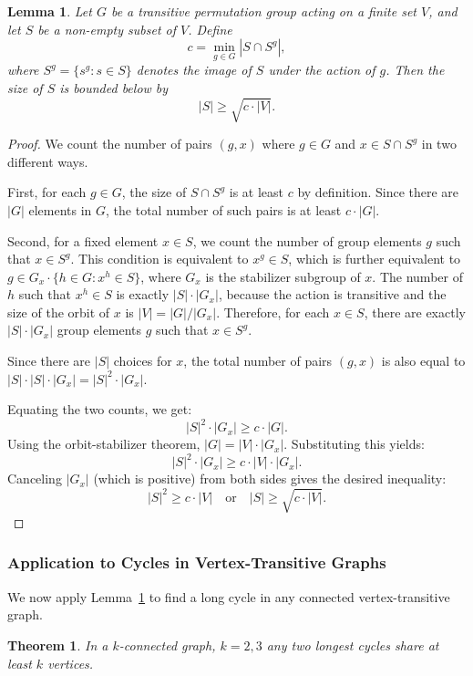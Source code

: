 \documentclass[12pt,a4paper,openany]{book}
\newtheorem{theorem}{Theorem}[section]
\newtheorem{lemma}{Lemma}[section]
\begin{document}
\begin{lemma}\label{lem:permutation-intersection}
Let $G$ be a transitive permutation group acting on a finite set $V$, and let $S$ be a non-empty subset of $V$. Define
\[
c = \min_{g \in G} |S \cap S^g|,
\]
where $S^g = \{s^g : s \in S\}$ denotes the image of $S$ under the action of $g$. Then the size of $S$ is bounded below by
\[
|S| \ge \sqrt{c \cdot |V|}.
\]
\end{lemma}
\begin{proof}
We count the number of pairs $(g, x)$ where $g \in G$ and $x \in S \cap S^g$ in two different ways.

First, for each $g \in G$, the size of $S \cap S^g$ is at least $c$ by definition. Since there are $|G|$ elements in $G$, the total number of such pairs is at least $c \cdot |G|$.

Second, for a fixed element $x \in S$, we count the number of group elements $g$ such that $x \in S^g$. This condition is equivalent to $x^g \in S$, which is further equivalent to $g \in G_x \cdot \{h \in G : x^h \in S\}$, where $G_x$ is the stabilizer subgroup of $x$. The number of $h$ such that $x^h \in S$ is exactly $|S| \cdot |G_x|$, because the action is transitive and the size of the orbit of $x$ is $|V| = |G| / |G_x|$. Therefore, for each $x \in S$, there are exactly $|S| \cdot |G_x|$ group elements $g$ such that $x \in S^g$.

Since there are $|S|$ choices for $x$, the total number of pairs $(g, x)$ is also equal to $|S| \cdot |S| \cdot |G_x| = |S|^2 \cdot |G_x|$.

Equating the two counts, we get:
\[
|S|^2 \cdot |G_x| \ge c \cdot |G|.
\]
Using the orbit-stabilizer theorem, $|G| = |V| \cdot |G_x|$. Substituting this yields:
\[
|S|^2 \cdot |G_x| \ge c \cdot |V| \cdot |G_x|.
\]
Canceling $|G_x|$ (which is positive) from both sides gives the desired inequality:
\[
|S|^2 \ge c \cdot |V| \quad \text{or} \quad |S| \ge \sqrt{c \cdot |V|}.
\]
\end{proof}

\subsubsection*{Application to Cycles in Vertex-Transitive Graphs}

We now apply Lemma~\ref{lem:permutation-intersection} to find a long cycle in any connected vertex-transitive graph.

\begin{theorem}
In a $k$-connected graph, $k=2,3$ any two longest cycles share at least $k$ vertices.
\end{theorem}
\end{document}
